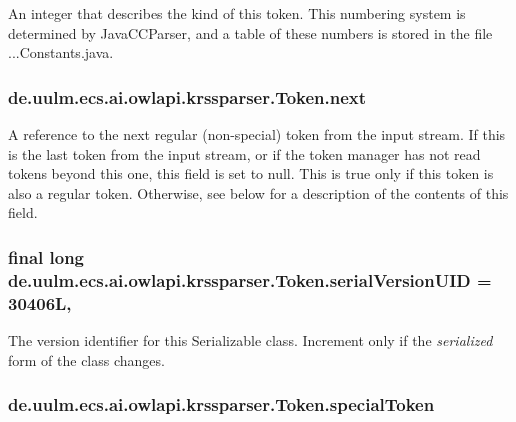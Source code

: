 An integer that describes the kind of this token. This numbering system is determined by Java\-C\-C\-Parser, and a table of these numbers is stored in the file ...Constants.\-java. \hypertarget{classde_1_1uulm_1_1ecs_1_1ai_1_1owlapi_1_1krssparser_1_1_token_a6c735fe5aa095688905e5c722caaf936}{
\subsubsection[{next}]{ de.\-uulm.\-ecs.\-ai.\-owlapi.\-krssparser.\-Token.\-next}}\label{classde_1_1uulm_1_1ecs_1_1ai_1_1owlapi_1_1krssparser_1_1_token_a6c735fe5aa095688905e5c722caaf936}
A reference to the next regular (non-\/special) token from the input stream. If this is the last token from the input stream, or if the token manager has not read tokens beyond this one, this field is set to null. This is true only if this token is also a regular token. Otherwise, see below for a description of the contents of this field. \hypertarget{classde_1_1uulm_1_1ecs_1_1ai_1_1owlapi_1_1krssparser_1_1_token_acb26c4ecfca3bbf2a26820e4a167896e}{
\subsubsection[{serial\-Version\-U\-I\-D}]{\setlength{\rightskip}{0pt plus 5cm}final long de.\-uulm.\-ecs.\-ai.\-owlapi.\-krssparser.\-Token.\-serial\-Version\-U\-I\-D = 30406\-L\hspace{0.3cm}{\ttfamily [static]}, {\ttfamily [private]}}}\label{classde_1_1uulm_1_1ecs_1_1ai_1_1owlapi_1_1krssparser_1_1_token_acb26c4ecfca3bbf2a26820e4a167896e}
The version identifier for this Serializable class. Increment only if the {\itshape serialized} form of the class changes. \hypertarget{classde_1_1uulm_1_1ecs_1_1ai_1_1owlapi_1_1krssparser_1_1_token_a38d112323e0c65556a3ed3b78af3f998}{
\subsubsection[{special\-Token}]{ de.\-uulm.\-ecs.\-ai.\-owlapi.\-krssparser.\-Token.\-special\-Token}}\label{classde_1_1uulm_1_1ecs_1_1ai_1_1owlapi_1_1krssparser_1_1_token_a38d112323e0c65556a3ed3b78af3f998}
